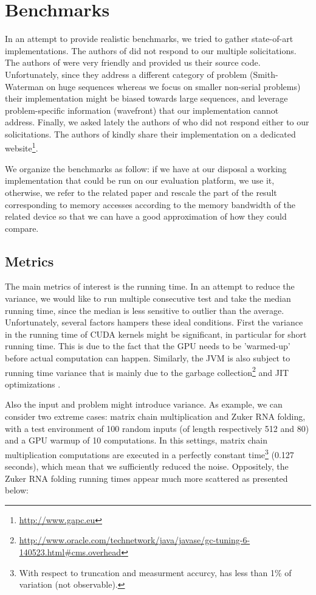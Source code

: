 
\section{Benchmarks} \label{benchmarks}
In an attempt to provide realistic benchmarks, we tried to gather state-of-art implementations. The authors of \cite{gpu_atlp} did not respond to our multiple solicitations. The authors of \cite{swat_mega} were very friendly and provided us their source code. Unfortunately, since they address a different category of problem (Smith-Waterman on huge sequences whereas we focus on smaller non-serial problems) their implementation might be biased towards large sequences, and leverage problem-specific information (wavefront) that our implementation cannot address. Finally, we asked lately the authors of \cite{gpu_rnafold} who did not respond either to our solicitations. The authors of \cite{gapc_thesis} kindly share their implementation on a dedicated website\footnote{\url{http://www.gapc.eu}}.

We organize the benchmarks as follow: if we have at our disposal a working implementation that could be run on our evaluation platform, we use it, otherwise, we refer to the related paper and rescale the part of the result corresponding to memory accesses according to the memory bandwidth of the related device so that we can have a good approximation of how they could compare.

\subsection{Metrics} \label{metrics}
The main metrics of interest is the running time. In an attempt to reduce the variance, we would like to run multiple consecutive test and take the median running time, since the median is less sensitive to outlier than the average\cite{perfeval}. Unfortunately, several factors hampers these ideal conditions. First the variance in the running time of CUDA kernels might be significant, in particular for short running time. This is due to the fact that the GPU needs to be 'warmed-up' before actual computation can happen. Similarly, the JVM is also subject to running time variance that is mainly due to the garbage collection\footnote{\url{http://www.oracle.com/technetwork/java/javase/gc-tuning-6-140523.html\#cms.overhead}} and JIT optimizations \cite{java_jit}.

Also the input and problem might introduce variance. As example, we can consider two extreme cases: matrix chain multiplication and Zuker RNA folding, with a test environment of 100 random inputs (of length respectively 512 and 80) and a GPU warmup of 10 computations. In this settings, matrix chain multiplication computations are executed in a perfectly constant time\footnote{With respect to truncation and measurment accurcy, has less than 1\% of variation (not observable).} (0.127 seconds), which mean that we sufficiently reduced the noise. Oppositely, the Zuker RNA folding running times appear much more scattered as presented below:

